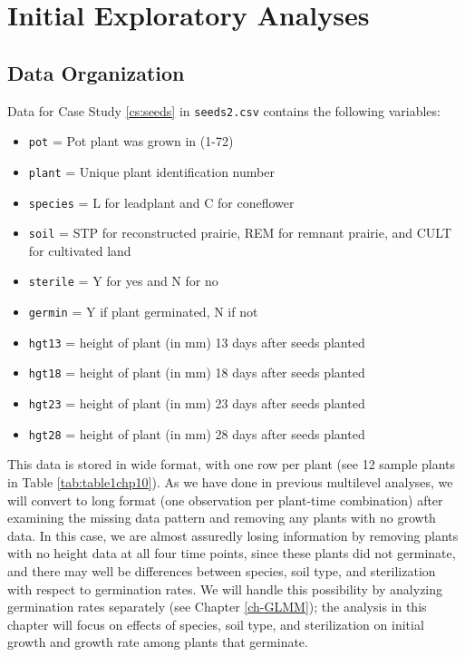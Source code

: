 \documentclass[
]{krantz}
\providecommand{\tightlist}{%
  \setlength{\itemsep}{0pt}\setlength{\parskip}{0pt}}
\begin{document}
\hypertarget{explore3}{%
\section{Initial Exploratory Analyses}\label{explore3}}

\hypertarget{organizedata3}{%
\subsection{Data Organization}\label{organizedata3}}

Data for Case Study \ref{cs:seeds} in \texttt{seeds2.csv} contains the following variables:

\begin{itemize}
\tightlist
\item
  \texttt{pot} = Pot plant was grown in (1-72)
\item
  \texttt{plant} = Unique plant identification number
\item
  \texttt{species} = L for leadplant and C for coneflower
\item
  \texttt{soil} = STP for reconstructed prairie, REM for remnant prairie, and CULT for cultivated land
\item
  \texttt{sterile} = Y for yes and N for no
\item
  \texttt{germin} = Y if plant germinated, N if not
\item
  \texttt{hgt13} = height of plant (in mm) 13 days after seeds planted
\item
  \texttt{hgt18} = height of plant (in mm) 18 days after seeds planted
\item
  \texttt{hgt23} = height of plant (in mm) 23 days after seeds planted
\item
  \texttt{hgt28} = height of plant (in mm) 28 days after seeds planted
\end{itemize}

This data is stored in wide format, with one row per plant (see 12 sample plants in Table \ref{tab:table1chp10}). As we have done in previous multilevel analyses, we will convert to long format (one observation per plant-time combination) after examining the missing data pattern and removing any plants with no growth data. In this case, we are almost assuredly losing information by removing plants with no height data at all four time points, since these plants did not germinate, and there may well be differences between species, soil type, and sterilization with respect to germination rates. We will handle this possibility by analyzing germination rates separately (see Chapter \ref{ch-GLMM}); the analysis in this chapter will focus on effects of species, soil type, and sterilization on initial growth and growth rate among plants that germinate.
\end{document}
